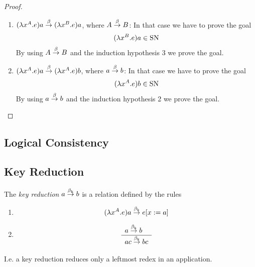 \begin{theorem}
\begin{proof}
\begin{enumerate}
        \item $(\lambda x^A.e)a \stackrel{\beta}{\to} (\lambda x^B.e)a$, where $A \stackrel{\beta}{\to} B$:
            In that case we have to prove the goal
            $$
                (\lambda x^B.e)a \in \text{SN}
            $$
            By using $A \stackrel{\beta}{\to} B$ and the induction hypothesis 3 we prove the
            goal.

        \item $(\lambda x^A.e)a \stackrel{\beta}{\to} (\lambda x^A.e)b$, where $a \stackrel{\beta}{\to}
            b$: In that case we have to prove the goal
            $$
                (\lambda x^A.e)b \in \text{SN}
            $$
            By using $a \stackrel{\beta}{\to} b$ and the induction hypothesis 2 we prove the
            goal.
        \end{enumerate}
    \end{proof}
\end{theorem}








\subsection{Logical Consistency}







\subsection{Key Reduction}

\begin{definition}
    The \emph{key reduction} $a \stackrel{\beta_{\text{k}}}{\to} b$ is a relation defined by the rules
    \begin{enumerate}
    \item
        $$(\lambda x^A.e) a \stackrel{\beta_{\text{k}}}{\to} e[x:=a]$$

    \item
        $$
        \begin{array}{l} 
            a \stackrel{\beta_{\text{k}}}{\to} b
         \\ \hline 
            ac \stackrel{\beta_{\text{k}}}{\to} bc
        \end{array}
        $$
    \end{enumerate}
    I.e. a key reduction reduces only a leftmost redex in an application.
\end{definition}





